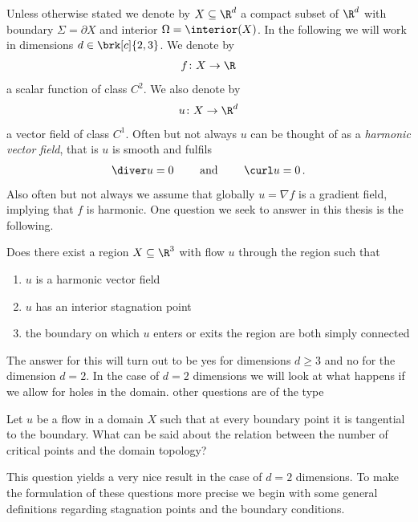 Unless otherwise stated we denote by $X\subseteq\R^d$ a compact subset of $\R^d$ with boundary $\Sigma=\partial X$ and interior
$\Omega=\interior(X)$.
In the following we will work in dimensions $d\in\brk[c]{2,3}$.
We denote by
\begin{align*}
  f\colon X\to\R
\end{align*}
a scalar function of class $C^2$.
We also denote by
\begin{align*}
  u\colon X\to\R^d
\end{align*}
a vector field of class $C^1$.
Often but not always $u$ can be thought of as 
a \emph{harmonic vector field}, that is $u$ is smooth and fulfils
\begin{align*}
  \diver u=0 \qquad \text{ and }\qquad \curl u=0\,.
\end{align*}
Also often but not always we assume that globally $u=\nabla f$ is a gradient field, implying that $f$ is harmonic.
One question we seek to answer in this thesis is the following.
\begin{question}\label{qu:flowthroughStagnationPoint}
  Does there exist a region $X\subseteq\R^3$ with flow $u$ through the region such that
  \begin{enumerate}
    \item $u$ is a harmonic vector field
    \item $u$ has an interior stagnation point
    \item the boundary on which $u$ enters or exits the region are both simply connected
  \end{enumerate}
\end{question}
The answer for this will turn out to be yes for dimensions $d\geq3$ and no for the dimension $d=2$.
In the case of $d=2$ dimensions we will look at what happens if we allow for holes in the domain.
other questions are of the type
\begin{question}
  Let $u$ be a flow in a domain $X$ such that at every boundary point it is tangential to the boundary.
  What can be said about the relation between the number of critical points and the domain topology?
\end{question}
This question yields a very nice result in the case of $d=2$ dimensions.
To make the formulation of these questions more precise we begin with some general definitions regarding stagnation points and the boundary conditions.


